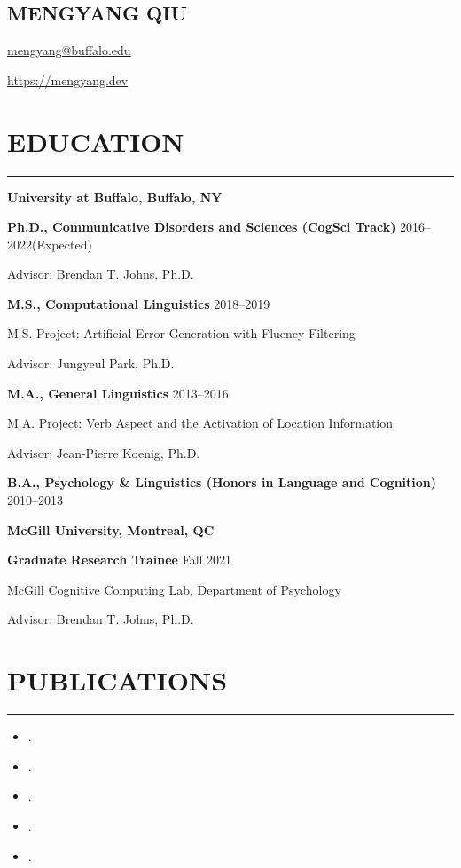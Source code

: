 \documentclass[11pt]{article}
\newcommand{\name}[1]{\begin{center}\section*{\Huge #1}\end{center}}
\newcommand{\topinfo}[1]{\begin{center}\vspace{-0.2cm}#1\vspace{-0.2cm}\end{center}}
\newcommand{\cvsection}[1]{\vspace{-0.2cm}\section*{\Large #1}\vspace{-0.2cm}\hrule\vspace{0.2cm}}
\newcommand{\h}[1]{\hspace{15pt} #1}
\begin{document}
\name{MENGYANG QIU}
\topinfo{\href{mailto:mengyang@buffalo.edu}{mengyang@buffalo.edu}}
\topinfo{\url{https://mengyang.dev}}



\cvsection{EDUCATION}

\textbf{\large University at Buffalo, Buffalo, NY}

\textbf{Ph.D., Communicative Disorders and Sciences (CogSci Track)} \hfill 2016--2022(Expected)

\h{Advisor: Brendan T. Johns, Ph.D.}

\textbf{M.S., Computational Linguistics} \hfill 2018--2019

\h{M.S. Project: Artificial Error Generation with Fluency Filtering}

\h{Advisor: Jungyeul Park, Ph.D.}

\textbf{M.A., General Linguistics} \hfill 2013--2016

\h{M.A. Project: Verb Aspect and the Activation of Location Information}

\h{Advisor: Jean-Pierre Koenig, Ph.D.}

\textbf{B.A., Psychology \& Linguistics (Honors in Language and Cognition)} \hfill 2010--2013

\bigskip

\textbf{\large McGill University, Montreal, QC}

\textbf{Graduate Research Trainee} \hfill Fall 2021

\h{McGill Cognitive Computing Lab, Department of Psychology}

\h{Advisor: Brendan T. Johns, Ph.D.}

\cvsection{PUBLICATIONS}

\begin{itemize}[leftmargin=!,labelindent=!,itemindent=-18pt]
    \setlength\itemsep{0.3em}

    \item[] .
    \item[] .
    \item[] .
    \item[] .
    \item[] .

\end{itemize}
\end{document}
